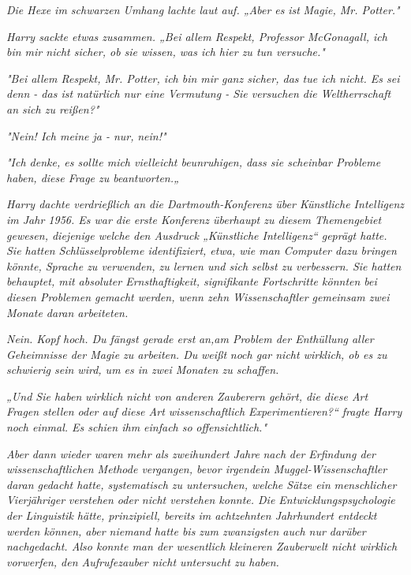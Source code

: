 {\emph{Die Hexe im schwarzen Umhang lachte laut auf. „Aber es} \emph{\emph{ist}} \emph{Magie, Mr. Potter."}

\emph{Harry sackte etwas zusammen. „Bei allem Respekt, Professor McGonagall, ich bin mir nicht sicher, ob sie wissen, was ich hier zu tun versuche."}

\emph{"Bei allem Respekt, Mr. Potter, ich bin mir ganz sicher, das tue ich nicht. Es sei denn - das ist natürlich nur eine Vermutung - Sie versuchen die Weltherrschaft an sich zu reißen?"}

\emph{"Nein! Ich meine ja - nur,} \emph{\emph{nein!}"}

\emph{"Ich denke, es sollte mich vielleicht beunruhigen, dass sie scheinbar Probleme haben, diese Frage zu beantworten.„}

\emph{Harry dachte verdrießlich an die Dartmouth-Konferenz über Künstliche Intelligenz im Jahr 1956. Es war die erste Konferenz überhaupt zu diesem Themengebiet gewesen, diejenige welche den Ausdruck „Künstliche Intelligenz“ geprägt hatte. Sie hatten Schlüsselprobleme identifiziert, etwa, wie man Computer dazu bringen könnte, Sprache zu verwenden, zu lernen und sich selbst zu verbessern. Sie hatten behauptet, mit absoluter Ernsthaftigkeit, signifikante Fortschritte könnten bei diesen Problemen gemacht werden, wenn zehn Wissenschaftler gemeinsam zwei Monate daran arbeiteten.}

\emph{\emph{Nein. Kopf hoch. Du fängst gerade erst}} \emph{an\emph{,}\emph{am Problem der Enthüllung aller Geheimnisse der Magie zu arbeiten. Du}} \emph{weißt} \emph{\emph{noch gar nicht wirklich, ob es zu schwierig sein wird, um es in zwei Monaten zu schaffen.}}

\emph{„Und Sie haben} \emph{\emph{wirklich}} \emph{nicht von anderen Zauberern gehört, die diese Art Fragen stellen oder auf diese Art wissenschaftlich Experimentieren?“ fragte Harry noch einmal. Es schien ihm einfach so} \emph{\emph{offensichtlich.}"}

\emph{Aber dann wieder waren mehr als zweihundert Jahre} \emph{\emph{nach}} \emph{der Erfindung der wissenschaftlichen Methode vergangen, bevor irgendein Muggel-Wissenschaftler daran gedacht hatte, systematisch zu untersuchen, welche Sätze ein} \emph{\emph{menschlicher Vierjähriger}} \emph{verstehen oder nicht verstehen konnte. Die Entwicklungspsychologie der Linguistik hätte, prinzipiell, bereits im achtzehnten Jahrhundert entdeckt werden können, aber niemand hatte bis zum zwanzigsten auch nur darüber nachgedacht. Also konnte man der wesentlich kleineren Zauberwelt nicht wirklich vorwerfen, den Aufrufezauber nicht untersucht zu haben.}

}
